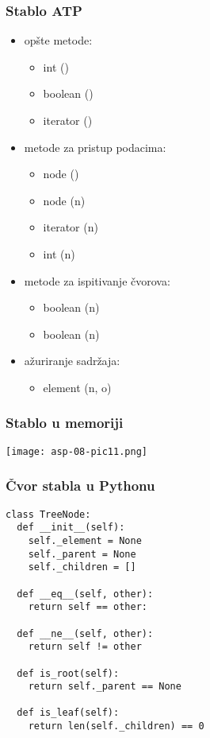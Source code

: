 \documentclass[compress]{beamer}
\begin{document}
\begin{frame}[fragile]
  \frametitle{Stablo ATP}
  \begin{itemize}
    \item opšte metode:
    \begin{itemize}
      \item int ()
      \item boolean ()
      \item iterator ()
    \end{itemize}
    \item metode za pristup podacima:
    \begin{itemize}
      \item node ()
      \item node (n)
      \item iterator (n)
      \item int (n)
    \end{itemize}
    \item metode za ispitivanje čvorova:
    \begin{itemize}
      \item boolean (n)
      \item boolean (n)
    \end{itemize}
    \item ažuriranje sadržaja:
    \begin{itemize}
      \item element (n, o)
    \end{itemize}
  \end{itemize}
\end{frame}

\begin{frame}[fragile]
  \frametitle{Stablo u memoriji}
\begin{center}
  \texttt{[image: asp-08-pic11.png]}
\end{center}
\end{frame}

\begin{frame}
  \frametitle{Čvor stabla u Pythonu}
\begin{verbatim}
class TreeNode:
  def __init__(self):
    self._element = None
    self._parent = None
    self._children = []
  
  def __eq__(self, other):
    return self == other:
    
  def __ne__(self, other):
    return self != other
  
  def is_root(self):
    return self._parent == None
    
  def is_leaf(self):
    return len(self._children) == 0
\end{verbatim}
\end{frame}
\end{document}
